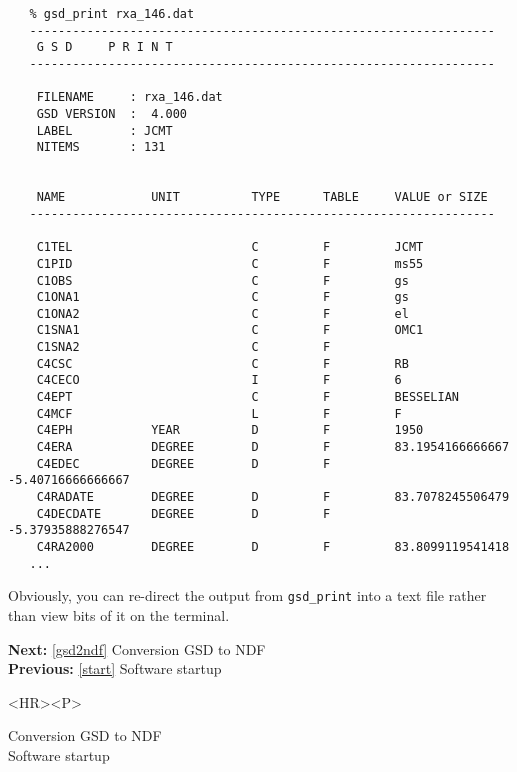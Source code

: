 \begin{verbatim}
   % gsd_print rxa_146.dat
   -----------------------------------------------------------------
    G S D     P R I N T
   -----------------------------------------------------------------

    FILENAME     : rxa_146.dat
    GSD VERSION  :  4.000
    LABEL        : JCMT
    NITEMS       : 131


    NAME            UNIT          TYPE      TABLE     VALUE or SIZE
   -----------------------------------------------------------------

    C1TEL                         C         F         JCMT
    C1PID                         C         F         ms55
    C1OBS                         C         F         gs
    C1ONA1                        C         F         gs
    C1ONA2                        C         F         el
    C1SNA1                        C         F         OMC1
    C1SNA2                        C         F
    C4CSC                         C         F         RB
    C4CECO                        I         F         6
    C4EPT                         C         F         BESSELIAN
    C4MCF                         L         F         F
    C4EPH           YEAR          D         F         1950
    C4ERA           DEGREE        D         F         83.1954166666667
    C4EDEC          DEGREE        D         F         -5.40716666666667
    C4RADATE        DEGREE        D         F         83.7078245506479
    C4DECDATE       DEGREE        D         F         -5.37935888276547
    C4RA2000        DEGREE        D         F         83.8099119541418
   ...
\end{verbatim}

   Obviously, you can re-direct the output from {\tt gsd\_print} into a
   text file rather than view bits of it on the terminal.

\begin{latexonly}
{\bf Next:} \ref{gsd2ndf} Conversion GSD to NDF\\
{\bf Previous:} \ref{start} Software startup\\
\end{latexonly}

\begin{htmlonly}
\begin{rawhtml} <HR><P> \end{rawhtml}
{\bf {}} Conversion GSD to NDF\\
{\bf {}} Software startup\\
{\bf {}}\\
{\bf {}}\\
\end{htmlonly}


